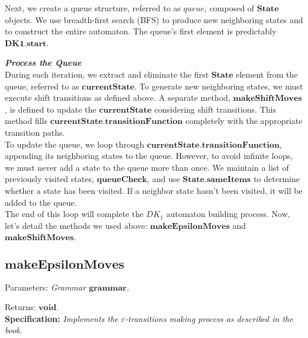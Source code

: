 Next, we create a queue structure, referred to as \(queue\), composed of \(\boldsymbol{State}\) objects. We use breadth-first search (BFS) to produce new neighboring states and to construct the entire automaton. The queue's first element is predictably \(\boldsymbol{DK1.start}\).\\

\vspace{15pt}

\textbf{\textit{Process the Queue}}\\

During each iteration, we extract and eliminate the first \(\boldsymbol{State}\) element from the queue, referred to as \(\boldsymbol{currentState}\). To generate new neighboring states, we must execute shift transitions as defined above. A separate method, \(\boldsymbol{makeShiftMoves}\), is defined to update the \(\boldsymbol{currentState}\) considering shift transitions. This method fills \(\boldsymbol{currentState.transitionFunction}\) completely with the appropriate transition paths.\\

To update the queue, we loop through \(\boldsymbol{currentState.transitionFunction}\), appending its neighboring states to the queue. However, to avoid infinite loops, we must never add a state to the queue more than once. We maintain a list of previously visited states, \(\boldsymbol{queueCheck}\), and use \(\boldsymbol{State.sameItems}\) to determine whether a state has been visited. If a neighbor state hasn't been visited, it will be added to the queue.\\

The end of this loop will complete the \(DK_{1}\) automaton building process. Now, let's detail the methods we used above: \(\boldsymbol{makeEpsilonMoves}\) and \(\boldsymbol{makeShiftMoves}\).

\vspace{30pt}

\subsection{\(\boldsymbol{makeEpsilonMoves}\)}

Parameters: \textit{Grammar \(\boldsymbol{grammar}\).}

Returns: \textit{\(\boldsymbol{void}\).}\\

\textbf{Specification:} \textit{Implements the \(\varepsilon\)-transitions making process as described in the book.}\\

